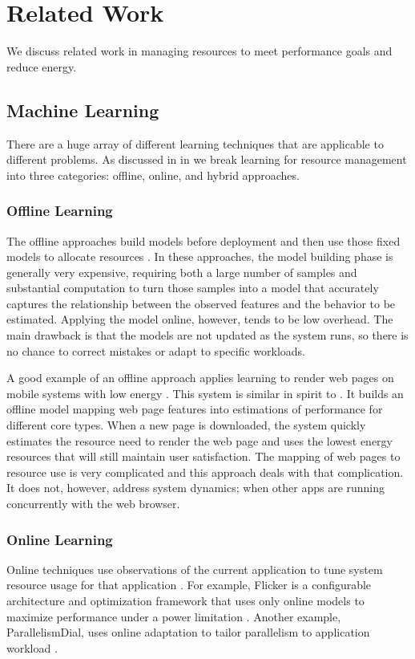 \section{Related Work}

We discuss related work in managing resources to meet performance
goals and reduce energy.  

\subsection{Machine Learning}
There are a huge array of different learning techniques that are
applicable to different problems.  As discussed in in 
we break learning for resource management into three categories:
offline, online, and hybrid approaches.  

\subsubsection{Offline Learning}
The offline approaches build models before deployment and then use
those fixed models to allocate resources
\cite{Yi2003,LeeBrooks2006,CPR,ChenJohn2011,petabricksStatic}.  In
these approaches, the model building phase is generally very expensive,
requiring both a large number of samples and substantial computation
to turn those samples into a model that accurately captures the
relationship between the observed features and the behavior to be
estimated.  Applying the model online, however, tends to be low
overhead.  The main drawback is that the models are not updated as the
system runs, so there is no chance to correct mistakes or adapt to
specific workloads.

A good example of an offline approach applies learning to render web
pages on mobile systems with low energy \cite{reddiHPCA2013}.  This
system is similar in spirit to \SYSTEM{}.  It builds an offline model
mapping web page features into estimations of performance for
different core types.  When a new page is downloaded, the system
quickly estimates the resource need to render the web page and uses the
lowest energy resources that will still maintain user satisfaction.
The mapping of web pages to resource use is very complicated and this
approach deals with that complication.  It does not, however, address
system dynamics; \eg when other apps are running concurrently with the
web browser.

\subsubsection{Online Learning}
Online techniques use observations of the current application to tune
system resource usage for that application
\cite{Li2006,Flicker,ParallelismDial,Ponamarev,petabricksDynamic,LeeBrooks}.
For example, Flicker is a configurable architecture and optimization
framework that uses only online models to maximize performance under a
power limitation \cite{Flicker}.  Another example, ParallelismDial,
uses online adaptation to tailor parallelism to application workload
\cite{ParallelismDial}.



